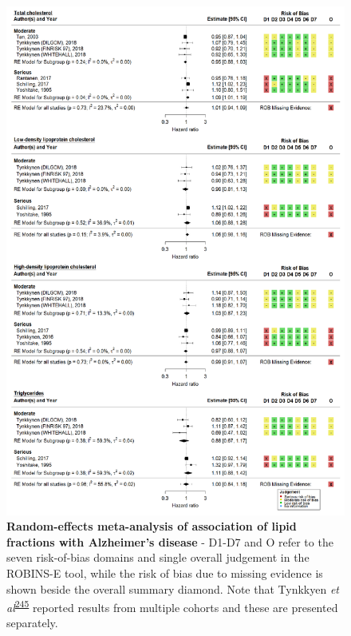 \documentclass[a4paper, twoside]{templates/ociamthesis}
\begin{document}
\begin{figure}[H]
\includegraphics[width=1\linewidth]{figures/sys-rev/fp_lipids_composite_AD} \caption[Random-effects meta-analysis of lipids on Alzheimer's disease]{\textbf{Random-effects meta-analysis of association of lipid fractions with Alzheimer's disease} - D1-D7 and O refer to the seven risk-of-bias domains and single overall judgement in the ROBINS-E tool, while the risk of bias due to missing evidence is shown beside the overall summary diamond. Note that Tynkkyen \emph{et al}\textsuperscript{\protect\hyperlink{ref-tynkkynen2018}{245}} reported results from multiple cohorts and these are presented separately.}\label{fig:lipidFractionsAD}
\end{figure}

\newpage
\end{document}
